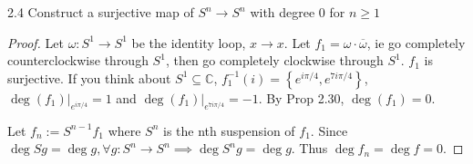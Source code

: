 \documentclass{article}
\newcommand*{\subeq}{\subseteq}
\newcommand{\C}{\mathbb{C}}
\begin{document}
\bigskip

\begin{PROB}{2.4}\label{Problem 2.4.}
    Construct a surjective map of $S^n \to S^n$ with degree 0 for $n \geq 1$  
\end{PROB}
\begin{proof}
    Let $\omega: S^1 \to S^1$ be the identity loop, $x \to x$. Let $f_1 = \omega \cdot \overline{\omega}$, ie go completely counterclockwise through $S^1$, then go completely clockwise through $S^1$. $f_1$ is surjective. If you think about $S^1 \subeq \C$, $f_1^{-1}(i) = \left\{ e^{i \pi / 4}, e^{7 i \pi / 4} \right\}$, $\deg(f_1)|_{e^{i \pi / 4}} = 1$ and $\deg(f_1)|_{e^{7 i \pi / 4}} = -1$. By Prop 2.30, $\deg(f_1) = 0$. 
    
    Let $f_n := S^{n - 1}f_1$ where $S^{n}$ is the nth suspension of $f_1$. Since $\deg Sg = \deg g, \forall g: S^n \to S^n \implies \deg S^{n}g = \deg g$. Thus $\deg f_n = \deg f = 0$.     
\end{proof}

\bigskip
\end{document}
